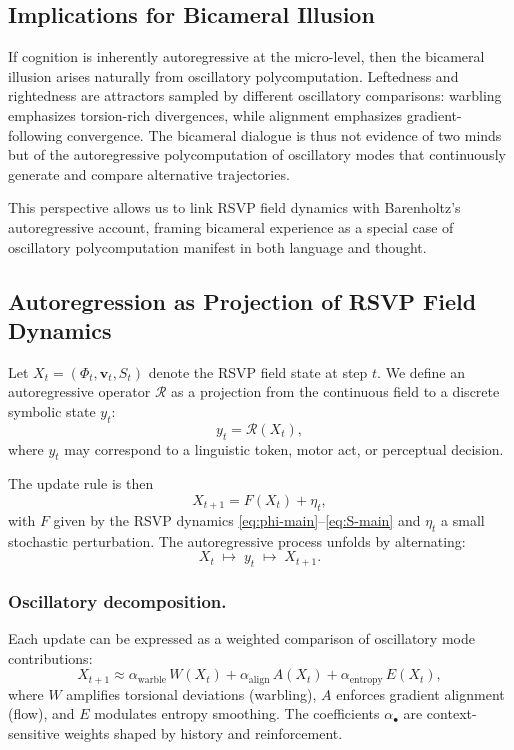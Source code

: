 \documentclass[a4paper,11pt]{article}
\begin{document}
\subsection{Implications for Bicameral Illusion}
If cognition is inherently autoregressive at the micro-level, then the bicameral illusion arises naturally from oscillatory polycomputation. Leftedness and rightedness are attractors sampled by different oscillatory comparisons: warbling emphasizes torsion-rich divergences, while alignment emphasizes gradient-following convergence. The bicameral dialogue is thus not evidence of two minds but of the autoregressive polycomputation of oscillatory modes that continuously generate and compare alternative trajectories.

This perspective allows us to link RSVP field dynamics with Barenholtz’s autoregressive account, framing bicameral experience as a special case of oscillatory polycomputation manifest in both language and thought. 

\subsection{Autoregression as Projection of RSVP Field Dynamics}

Let $X_t = (\Phi_t, \mathbf{v}_t, S_t)$ denote the RSVP field state at step $t$.  
We define an autoregressive operator $\mathcal{R}$ as a projection from the continuous field to a discrete symbolic state $y_t$:
\begin{equation}
y_t = \mathcal{R}(X_t),
\end{equation}
where $y_t$ may correspond to a linguistic token, motor act, or perceptual decision.  

The update rule is then
\begin{equation}
X_{t+1} = F(X_t) + \eta_t,
\end{equation}
with $F$ given by the RSVP dynamics \eqref{eq:phi-main}--\eqref{eq:S-main} and $\eta_t$ a small stochastic perturbation.  
The autoregressive process unfolds by alternating:
\begin{equation}
X_t \;\mapsto\; y_t \;\mapsto\; X_{t+1}.
\end{equation}

\subsubsection{Oscillatory decomposition.}  
Each update can be expressed as a weighted comparison of oscillatory mode contributions:
\begin{equation}
X_{t+1} \approx 
\alpha_{\mathrm{warble}} \, W(X_t)
+ \alpha_{\mathrm{align}} \, A(X_t)
+ \alpha_{\mathrm{entropy}} \, E(X_t),
\end{equation}
where $W$ amplifies torsional deviations (warbling), $A$ enforces gradient alignment (flow), and $E$ modulates entropy smoothing. The coefficients $\alpha_\bullet$ are context-sensitive weights shaped by history and reinforcement.  
\end{document}
